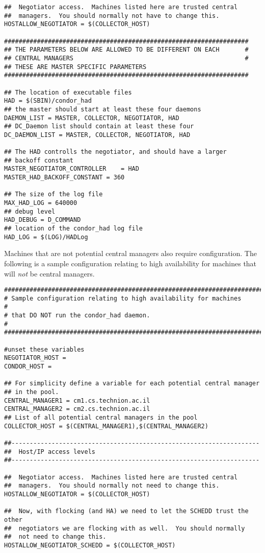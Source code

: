 \begin{verbatim}
##  Negotiator access.  Machines listed here are trusted central
##  managers.  You should normally not have to change this.
HOSTALLOW_NEGOTIATOR = $(COLLECTOR_HOST)

###################################################################
## THE PARAMETERS BELOW ARE ALLOWED TO BE DIFFERENT ON EACH       #
## CENTRAL MANAGERS                                               #
## THESE ARE MASTER SPECIFIC PARAMETERS
###################################################################

## The location of executable files
HAD = $(SBIN)/condor_had
## the master should start at least these four daemons
DAEMON_LIST = MASTER, COLLECTOR, NEGOTIATOR, HAD
## DC_Daemon list should contain at least these four
DC_DAEMON_LIST = MASTER, COLLECTOR, NEGOTIATOR, HAD

## The HAD controlls the negotiator, and should have a larger
## backoff constant
MASTER_NEGOTIATOR_CONTROLLER	= HAD
MASTER_HAD_BACKOFF_CONSTANT	= 360

## The size of the log file
MAX_HAD_LOG = 640000
## debug level 
HAD_DEBUG = D_COMMAND
## location of the condor_had log file
HAD_LOG = $(LOG)/HADLog

\end{verbatim}
\normalsize

Machines that are not potential central managers also 
require configuration.
The following is a sample configuration relating to
high availability for machines that will \emph{not} be central managers.

\footnotesize
\begin{verbatim}
##########################################################################
# Sample configuration relating to high availability for machines        # 
# that DO NOT run the condor_had daemon.                                 #
##########################################################################

#unset these variables 
NEGOTIATOR_HOST =
CONDOR_HOST =

## For simplicity define a variable for each potential central manager
## in the pool. 
CENTRAL_MANAGER1 = cm1.cs.technion.ac.il
CENTRAL_MANAGER2 = cm2.cs.technion.ac.il
## List of all potential central managers in the pool
COLLECTOR_HOST = $(CENTRAL_MANAGER1),$(CENTRAL_MANAGER2)

##--------------------------------------------------------------------
##  Host/IP access levels
##--------------------------------------------------------------------

##  Negotiator access.  Machines listed here are trusted central
##  managers.  You should normally not need to change this.
HOSTALLOW_NEGOTIATOR = $(COLLECTOR_HOST)

##  Now, with flocking (and HA) we need to let the SCHEDD trust the other 
##  negotiators we are flocking with as well.  You should normally 
##  not need to change this.
HOSTALLOW_NEGOTIATOR_SCHEDD = $(COLLECTOR_HOST) 
\end{verbatim}
\normalsize

